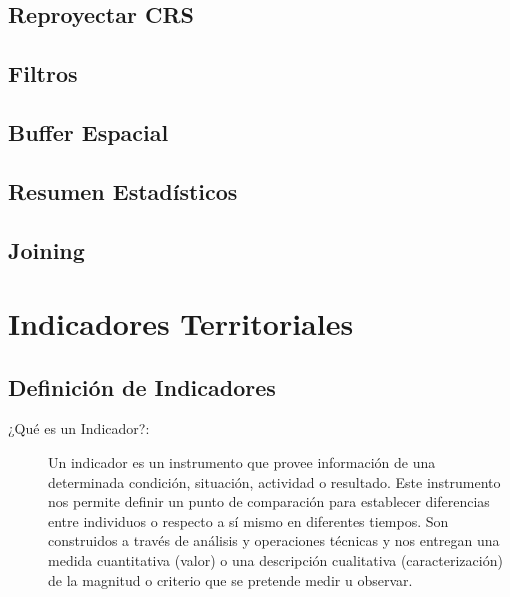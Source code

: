 \documentclass[
  letterpaper,
  DIV=11,
  numbers=noendperiod]{scrreprt}
\begin{document}
\hypertarget{reproyectar-crs}{%
\subsection{Reproyectar CRS}\label{reproyectar-crs}}

\hypertarget{filtros}{%
\subsection{Filtros}\label{filtros}}

\hypertarget{buffer-espacial}{%
\subsection{Buffer Espacial}\label{buffer-espacial}}

\hypertarget{resumen-estaduxedsticos}{%
\subsection{Resumen Estadísticos}\label{resumen-estaduxedsticos}}

\hypertarget{joining}{%
\subsection{Joining}\label{joining}}

\hypertarget{indicadores-territoriales}{%
\section{Indicadores Territoriales}\label{indicadores-territoriales}}

\hypertarget{definiciuxf3n-de-indicadores}{%
\subsection{Definición de
Indicadores}\label{definiciuxf3n-de-indicadores}}

\begin{description}
\item[¿Qué es un Indicador?:]
Un indicador es un instrumento que provee información de una determinada
condición, situación, actividad o resultado. Este instrumento nos
permite definir un punto de comparación para establecer diferencias
entre individuos o respecto a sí mismo en diferentes tiempos. Son
construidos a través de análisis y operaciones técnicas y nos entregan
una medida cuantitativa (valor) o una descripción cualitativa
(caracterización) de la magnitud o criterio que se pretende medir u
observar.
\end{description}
\end{document}
